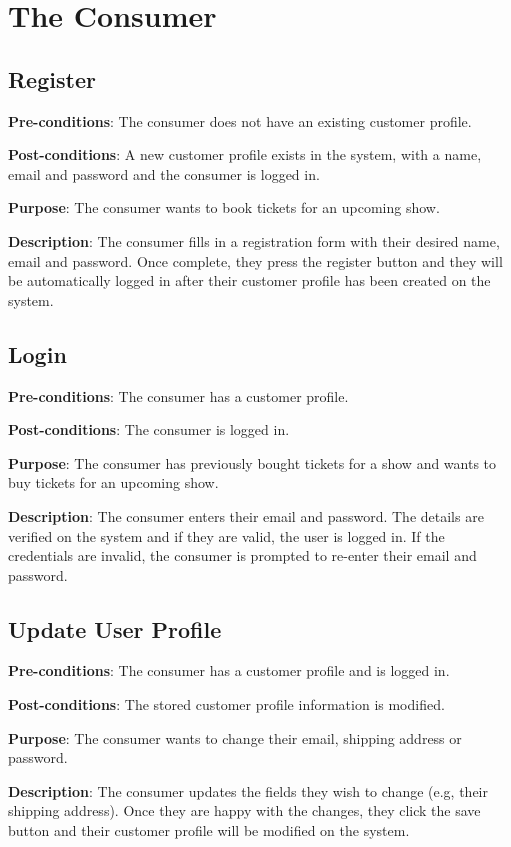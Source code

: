 \section{The Consumer}

\subsection{Register}
\textbf{Pre-conditions}: The consumer does not have an existing customer profile.

\textbf{Post-conditions}: A new customer profile exists in the system, with a name, email and password and the consumer is logged in.

\textbf{Purpose}: The consumer wants to book tickets for an upcoming show.

\textbf{Description}: The consumer fills in a registration form with their desired name, email and password. Once complete, they press the register button and they will be automatically logged in after their customer profile has been created on the system.

\subsection{Login}
\textbf{Pre-conditions}: The consumer has a customer profile.

\textbf{Post-conditions}: The consumer is logged in.

\textbf{Purpose}: The consumer has previously bought tickets for a show and wants to buy tickets for an upcoming show.

\textbf{Description}: The consumer enters their email and password. The details are verified on the system and if they are valid, the user is logged in. If the credentials are invalid, the consumer is prompted to re-enter their email and password.

\subsection{Update User Profile}
\textbf{Pre-conditions}: The consumer has a customer profile and is logged in.

\textbf{Post-conditions}: The stored customer profile information is modified.

\textbf{Purpose}: The consumer wants to change their email, shipping address or password.

\textbf{Description}: The consumer updates the fields they wish to change (e.g, their shipping address). Once they are happy with the changes, they click the save button and their customer profile will be modified on the system.

